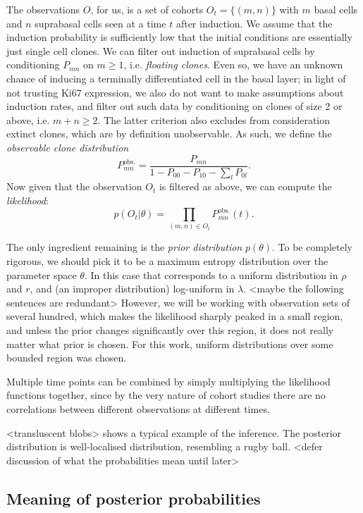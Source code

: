 \documentclass[10pt,UKenglish]{article}
\begin{document}
The observations $O$, for us, is a set of cohorts $O_t = \{(m,n)\}$ with $m$ basal cells and $n$ suprabasal cells seen at a time $t$ after induction. We assume that the induction probability is sufficiently low that the initial conditions are essentially just single cell clones. We can filter out induction of suprabasal cells by conditioning $P_{mn}$ on $m \ge 1$, i.e. \emph{floating clones}. Even so, we have an unknown chance of inducing a terminally differentiated cell in the basal layer; in light of not trusting Ki67 expression, we also do not want to make assumptions about induction rates, and filter out such data by conditioning on clones of size 2 or above, i.e. $m+n \ge 2$. The latter criterion also excludes from consideration extinct clones, which are by definition unobservable. As such, we define the \emph{observable clone distribution} $$P^\textrm{obs.}_{mn} = \frac{P_{mn}}{1 - P_{00} - P_{10} - \sum_l P_{0l}}.$$ Now given that the observation $O_t$ is filtered as above, we can compute the \emph{likelihood}: $$p(O_t|\theta) = \prod_{(m,n) \in O_t} P^\textrm{obs.}_{mn}(t).$$

The only ingredient remaining is the \emph{prior distribution} $p(\theta)$. To be completely rigorous, we should pick it to be a maximum entropy distribution over the parameter space $\theta$. In this case that corresponds to a uniform distribution in $\rho$ and $r$, and (an improper distribution) log-uniform in $\lambda$. <maybe the following sentences are redundant> However, we will be working with observation sets of several hundred, which makes the likelihood sharply peaked in a small region, and unless the prior changes significantly over this region, it does not really matter what prior is chosen. For this work, uniform distributions over some bounded region was chosen.

Multiple time points can be combined by simply multiplying the likelihood functions together, since by the very nature of cohort studies there are no correlations between different observations at different times.

<transluscent blobs> shows a typical example of the inference. The posterior distribution is well-localised distribution, resembling a rugby ball. <defer discussion of what the probabilities mean until later>

\subsection{Meaning of posterior probabilities}
\end{document}

